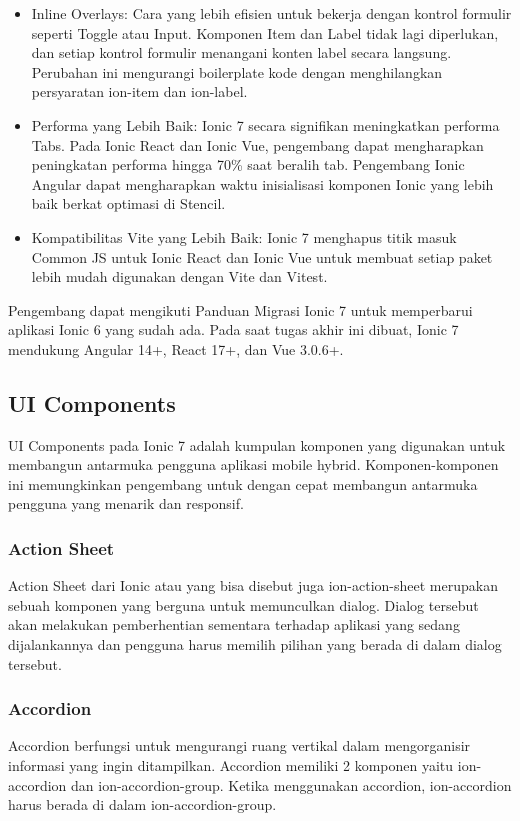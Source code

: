 \begin{itemize}
    \item Inline Overlays: Cara yang lebih efisien untuk bekerja dengan kontrol formulir seperti Toggle atau Input. Komponen Item dan Label tidak lagi diperlukan, dan setiap kontrol formulir menangani konten label secara langsung. Perubahan ini mengurangi boilerplate kode dengan menghilangkan persyaratan ion-item dan ion-label.
    \item Performa yang Lebih Baik: Ionic 7 secara signifikan meningkatkan performa Tabs. Pada Ionic React dan Ionic Vue, pengembang dapat mengharapkan peningkatan performa hingga 70\% saat beralih tab. Pengembang Ionic Angular dapat mengharapkan waktu inisialisasi komponen Ionic yang lebih baik berkat optimasi di Stencil.
    \item Kompatibilitas Vite yang Lebih Baik: Ionic 7 menghapus titik masuk Common JS untuk Ionic React dan Ionic Vue untuk membuat setiap paket lebih mudah digunakan dengan Vite dan Vitest.
\end{itemize}

Pengembang dapat mengikuti Panduan Migrasi Ionic 7 untuk memperbarui aplikasi Ionic 6 yang sudah ada. Pada saat tugas akhir ini dibuat, Ionic 7 mendukung Angular 14+, React 17+, dan Vue 3.0.6+.

\subsection{UI Components}
UI Components pada Ionic 7 adalah kumpulan komponen yang digunakan untuk membangun antarmuka pengguna aplikasi mobile hybrid. Komponen-komponen ini memungkinkan pengembang untuk dengan cepat membangun antarmuka pengguna yang menarik dan responsif.

\subsubsection{Action Sheet}
Action Sheet dari Ionic atau yang bisa disebut juga ion-action-sheet merupakan sebuah komponen yang berguna untuk memunculkan dialog. Dialog tersebut akan melakukan pemberhentian sementara terhadap aplikasi yang sedang dijalankannya dan pengguna harus memilih pilihan yang berada di dalam dialog tersebut.

\subsubsection{Accordion}
Accordion berfungsi untuk mengurangi ruang vertikal dalam mengorganisir informasi yang ingin ditampilkan. Accordion memiliki 2 komponen yaitu ion-accordion dan ion-accordion-group. Ketika menggunakan accordion, ion-accordion harus berada di dalam ion-accordion-group.

